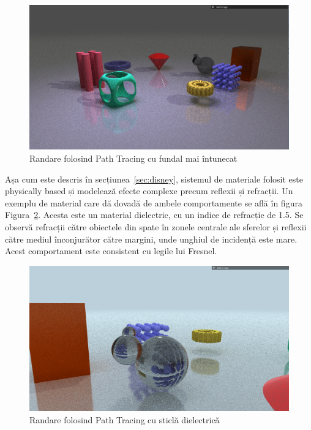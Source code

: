 \documentclass[12pt,a4paper]{report}
\numberwithin{equation}{section} %
\begin{document}
\begin{figure}[!htb]
	\centering
	\includegraphics[width=\textwidth]{pics/demo_pathtracing2.png}
	\caption{Randare folosind Path Tracing cu fundal mai întunecat}
	\label{fig:demo_pathtracing2}
\end{figure}

Așa cum este descris în secțiunea~\ref{sec:disney}, sistemul de materiale
folosit este physically based și modelează efecte complexe precum reflexii și
refracții. Un exemplu de material care dă dovadă de ambele comportamente se află
în figura Figura~\ref{fig:demo_refraction}. Acesta este un material dielectric, cu
un indice de refracție de 1.5. Se observă refracții către obiectele din spate
în zonele centrale ale sferelor și reflexii către mediul înconjurător către
margini, unde unghiul de incidență este mare. Acest comportament este consistent
cu legile lui Fresnel.
\begin{figure}[!htb]
	\centering
	\includegraphics[width=\textwidth]{pics/demo_refraction.png}
	\caption{Randare folosind Path Tracing cu sticlă dielectrică}
	\label{fig:demo_refraction}
\end{figure}
\end{document}
